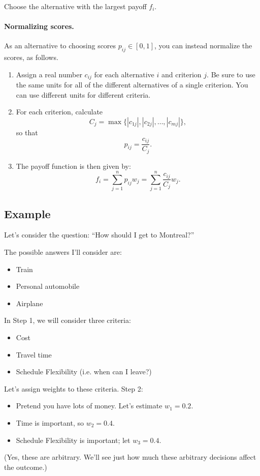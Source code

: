 Choose the alternative with the largest payoff $f_i$.

\paragraph{Normalizing scores.} As an alternative to choosing scores
$p_{ij} \in [0, 1]$, you can instead normalize the scores,
as follows.
\begin{enumerate}
\item Assign a real number $c_{ij}$ for each alternative $i$ and criterion $j$.
Be sure to use the same units for all of the different alternatives of a 
single criterion. You can use different units for different criteria.
\item For each criterion, calculate
\[ C_j = \max \{ |c_{1j}|, |c_{2j}|, \ldots, |c_{mj}| \}, \]
so that
\[ p_{ij} = \frac{c_{ij}}{C_j}. \]
\item The payoff function is then given by:
\[ f_i = \sum_{j=1}^n p_{ij} w_j = \sum_{j=1}^n \frac{c_{ij}}{C_j}  w_j. \]
\end{enumerate}

\subsection*{Example}
Let's consider the question: ``How should I get to Montreal?''

The possible answers I'll consider are:
\begin{itemize}
\item Train
\item Personal automobile
\item Airplane
\end{itemize}

In Step 1, we will consider three criteria:
\begin{itemize}
\item Cost
\item Travel time
\item Schedule Flexibility (i.e. when can I leave?)
\end{itemize}
Let's assign weights to these criteria. Step 2:
\begin{itemize}
\item Pretend you have lots of money. Let's estimate $w_1 = 0.2$.
\item Time is important, so $w_2 = 0.4$.
\item Schedule Flexibility is important; let $w_3 = 0.4$.
\end{itemize}
(Yes, these are arbitrary. We'll see just how much these arbitrary
decisions affect the outcome.)

